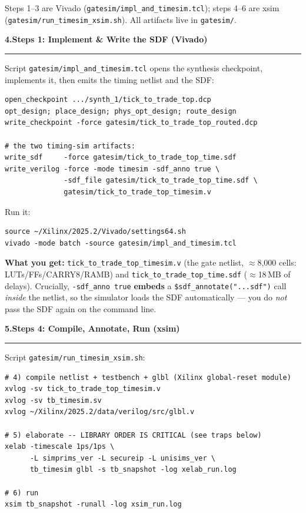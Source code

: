\documentclass[10pt,a4paper]{article}
\newcommand{\sectionrule}{\par\nobreak\vspace{1pt}\textcolor{rulegray}{\rule{\linewidth}{0.8pt}}\par\vspace{1pt}}
\newcommand{\fpath}[1]{\texttt{\textcolor{hdrblue}{#1}}}
\begin{document}
Steps 1--3 are Vivado (\fpath{gatesim/impl\_and\_timesim.tcl}); steps 4--6 are xsim
(\fpath{gatesim/run\_timesim\_xsim.sh}). All artifacts live in \fpath{gatesim/}.

{\large\bfseries\color{hdrblue} 4.\quad Steps 1: Implement \& Write the SDF (Vivado)}
\sectionrule

Script \fpath{gatesim/impl\_and\_timesim.tcl} opens the synthesis checkpoint,
implements it, then emits the timing netlist and the SDF:

\begin{lstlisting}[style=sh]
open_checkpoint .../synth_1/tick_to_trade_top.dcp
opt_design; place_design; phys_opt_design; route_design
write_checkpoint -force gatesim/tick_to_trade_top_routed.dcp

# the two timing-sim artifacts:
write_sdf     -force gatesim/tick_to_trade_top_time.sdf
write_verilog -force -mode timesim -sdf_anno true \
              -sdf_file gatesim/tick_to_trade_top_time.sdf \
              gatesim/tick_to_trade_top_timesim.v
\end{lstlisting}

Run it:
\begin{lstlisting}[style=sh]
source ~/Xilinx/2025.2/Vivado/settings64.sh
vivado -mode batch -source gatesim/impl_and_timesim.tcl
\end{lstlisting}

\textbf{What you get:} \fpath{tick\_to\_trade\_top\_timesim.v} (the gate netlist,
$\approx$8{,}000 cells: LUTs/FFs/CARRY8/RAMB) and
\fpath{tick\_to\_trade\_top\_time.sdf} ($\approx$18\,MB of delays). Crucially,
\texttt{-sdf\_anno true} \textbf{embeds} a \texttt{\$sdf\_annotate("...sdf")} call
\emph{inside} the netlist, so the simulator loads the SDF automatically --- you do
\emph{not} pass the SDF again on the command line.

{\large\bfseries\color{hdrblue} 5.\quad Steps 4: Compile, Annotate, Run (xsim)}
\sectionrule

Script \fpath{gatesim/run\_timesim\_xsim.sh}:

\begin{lstlisting}[style=sh]
# 4) compile netlist + testbench + glbl (Xilinx global-reset module)
xvlog -sv tick_to_trade_top_timesim.v
xvlog -sv tb_timesim.sv
xvlog ~/Xilinx/2025.2/data/verilog/src/glbl.v

# 5) elaborate -- LIBRARY ORDER IS CRITICAL (see traps below)
xelab -timescale 1ps/1ps \
      -L simprims_ver -L secureip -L unisims_ver \
      tb_timesim glbl -s tb_snapshot -log xelab_run.log

# 6) run
xsim tb_snapshot -runall -log xsim_run.log
\end{lstlisting}
\end{document}
